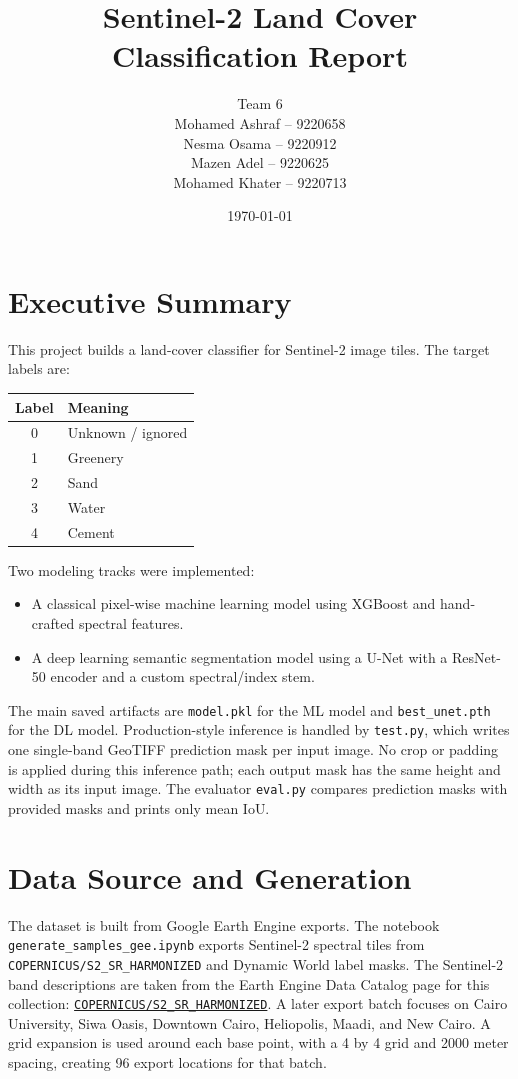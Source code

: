 \documentclass[11pt,a4paper]{article}
\title{Sentinel-2 Land Cover Classification Report}
\author{Team 6\\[0.5em]
Mohamed Ashraf -- 9220658\\
Nesma Osama -- 9220912\\
Mazen Adel -- 9220625\\
Mohamed Khater -- 9220713}
\date{\today}
\begin{document}
\maketitle
\tableofcontents
\newpage

\section{Executive Summary}

This project builds a land-cover classifier for Sentinel-2 image tiles. The target labels are:
\begin{center}
\begin{tabular}{cl}
\toprule
Label & Meaning \\
\midrule
0 & Unknown / ignored \\
1 & Greenery \\
2 & Sand \\
3 & Water \\
4 & Cement \\
\bottomrule
\end{tabular}
\end{center}

Two modeling tracks were implemented:
\begin{itemize}[noitemsep]
  \item A classical pixel-wise machine learning model using XGBoost and hand-crafted spectral features.
  \item A deep learning semantic segmentation model using a U-Net with a ResNet-50 encoder and a custom spectral/index stem.
\end{itemize}

The main saved artifacts are \texttt{model.pkl} for the ML model and \texttt{best\_unet.pth} for the DL model. Production-style inference is handled by \texttt{test.py}, which writes one single-band GeoTIFF prediction mask per input image. No crop or padding is applied during this inference path; each output mask has the same height and width as its input image. The evaluator \texttt{eval.py} compares prediction masks with provided masks and prints only mean IoU.

\section{Data Source and Generation}

The dataset is built from Google Earth Engine exports. The notebook \texttt{generate\_samples\_gee.ipynb} exports Sentinel-2 spectral tiles from \texttt{COPERNICUS/S2\_SR\_HARMONIZED} and Dynamic World label masks. The Sentinel-2 band descriptions are taken from the Earth Engine Data Catalog page for this collection: \href{https://developers.google.com/earth-engine/datasets/catalog/COPERNICUS_S2_SR_HARMONIZED}{\texttt{COPERNICUS/S2\_SR\_HARMONIZED}}. A later export batch focuses on Cairo University, Siwa Oasis, Downtown Cairo, Heliopolis, Maadi, and New Cairo. A grid expansion is used around each base point, with a 4 by 4 grid and 2000 meter spacing, creating 96 export locations for that batch.
\end{document}
